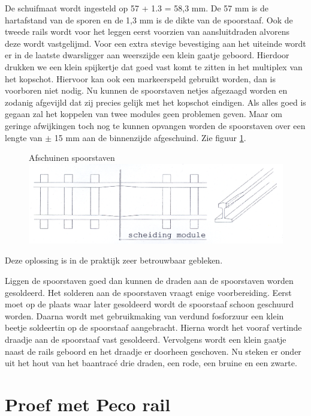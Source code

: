 \documentclass[12pt,a4paper]{report}
\newcommand*{\trace}{trac\'{e} }
\begin{document}
De schuifmaat wordt ingesteld op 57 + 1.3 = 58,3 mm. De 57 mm is de hartafstand van de sporen en de 1,3 mm is de dikte van de spoorstaaf.
Ook de tweede rails wordt voor het leggen eerst voorzien van aansluitdraden alvorens deze wordt vastgelijmd.
Voor een extra stevige bevestiging aan het uiteinde wordt er in de laatste dwarsligger aan weerszijde een klein gaatje geboord. Hierdoor drukken we een klein spijkertje dat goed vast komt te zitten in het multiplex van het kopschot. Hiervoor kan ook een markeerspeld gebruikt worden, dan is voorboren niet nodig. Nu kunnen de spoorstaven netjes afgezaagd worden en zodanig afgevijld dat zij precies gelijk met het kopschot eindigen. Als alles goed is gegaan zal het koppelen van twee modules geen problemen geven. Maar om geringe afwijkingen toch nog te kunnen opvangen worden de spoorstaven over een lengte van $\pm$ 15 mm aan de binnenzijde afgeschuind. Zie figuur \ref{figuur6}.

\begin{figure}[!ht]
  \captionbox
  {Afschuinen spoorstaven\label{figuur6}}
  {\includegraphics[scale=1.0]{images/rcu_figuur6}}
\end{figure}

Deze oplossing is in de praktijk zeer betrouwbaar gebleken.

Liggen de spoorstaven goed dan kunnen de draden aan de spoorstaven worden gesoldeerd. Het solderen aan de spoorstaven vraagt enige voorbereiding. Eerst moet op de plaats waar later gesoldeerd wordt de spoorstaaf schoon geschuurd worden. Daarna wordt met gebruikmaking van verdund fosforzuur een klein beetje soldeertin op de spoorstaaf aangebracht. Hierna wordt het vooraf vertinde draadje aan de spoorstaaf vast gesoldeerd. Vervolgens wordt een klein gaatje naast de rails geboord en het draadje er doorheen geschoven. Nu steken er onder uit het hout van het baan\trace drie draden, een rode, een bruine en een zwarte.

\section{Proef met Peco rail}
\end{document}
